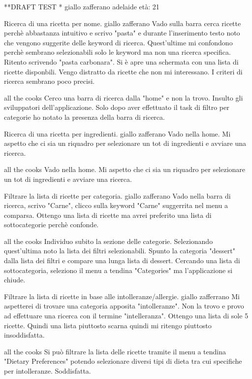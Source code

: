 **DRAFT TEST
* giallo zafferano
adelaide
età: 21

\item Ricerca di una ricetta per nome.
giallo zafferano
Vado sulla barra cerca ricette perchè abbastanza intuitivo e scrivo
"pasta" e durante l'inserimento testo noto che vengono
suggerite delle keyword di ricerca. Quest'ultime mi confondono perchè
sembrano selezionabili solo le keyword ma non una ricerca specifica. Ritento
scrivendo "pasta carbonara".
Si è apre una schermata con una
lista di ricette disponbili. Vengo distratto da ricette che non mi
interessano. I criteri di ricerca sembrano poco precisi.

all the cooks
Cerco una barra di ricerca dalla "home" e non la trovo. Insulto gli
sviluppatori dell'applicazione.
Solo dopo aver effettuato il task di filtro per categorie ho notato la
presenza della barra di ricerca.


\item Ricerca di una ricetta per ingredienti.
giallo zafferano
Vado nella home. Mi aspetto che ci sia un riquadro per selezionare un
tot di ingredienti e avviare una ricerca. 

all the cooks
Vado nella home. Mi aspetto che ci sia un riquadro per selezionare un
tot di ingredienti e avviare una ricerca. 

\item Filtrare la lista di ricette per categoria.
giallo zafferano
Vado nella barra di ricerca, scrivo "Carne", clicco sulla keyword
"Carne" suggerrita nel menu a comparsa. Ottengo una lista di ricette ma
avrei preferito una lista di sottocategorie perchè confonde.

all the cooks
Individuo subito la sezione delle categorie. Selezionando quest'ultima
noto la lista dei filtri selezionabili. Spunto la categoria "dessert"
dalla lista dei filtri e compare una lunga lista di dessert. Cercando
una lista di sottocategoria, seleziono il menu a tendina "Categories" ma
l'applicazione si chiude.

\item Filtrare la lista di ricette in base alle intolleranze/allergie.
giallo zafferrano
Mi aspetterei di trovare una categoria apposita "intolleranze". Non la
trovo e provo ad effettuare una ricerca con il termine "intelleranza".
Ottengo una lista di sole  5 ricette. Quindi una lista piuttosto scarna
quindi mi ritengo piuttosto insoddisfatta.

all the cooks
Si può filtrare la lista delle ricette tramite il menu a tendina
"Dietary Preferences" potendo selezionare diversi tipi di dieta tra cui
specifiche per intolleranze. Soddisfatta. 

